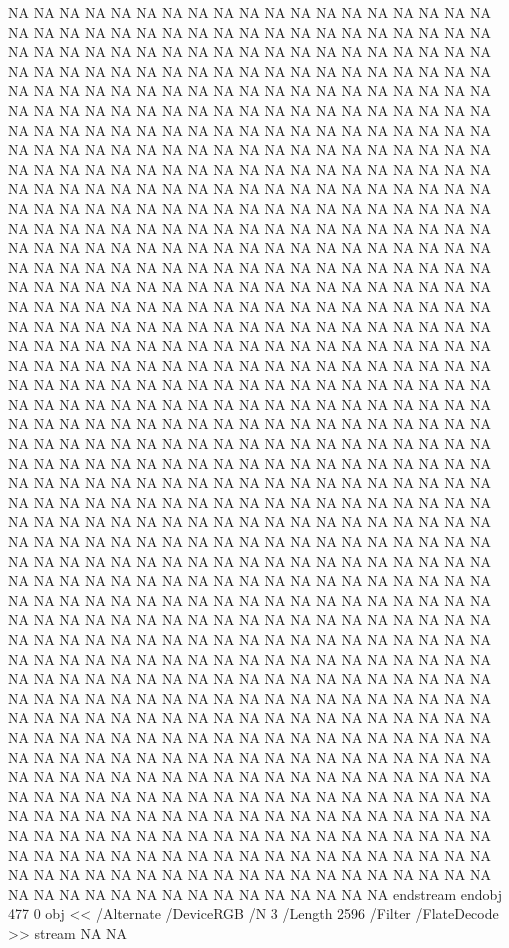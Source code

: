 {NA
NA
NA
NA
NA
NA
NA
NA
NA
NA
NA
NA
NA
NA
NA
NA
NA
NA
NA
NA
NA
NA
NA
NA
NA
NA
NA
NA
NA
NA
NA
NA
NA
NA
NA
NA
NA
NA
NA
NA
NA
NA
NA
NA
NA
NA
NA
NA
NA
NA
NA
NA
NA
NA
NA
NA
NA
NA
NA
NA
NA
NA
NA
NA
NA
NA
NA
NA
NA
NA
NA
NA
NA
NA
NA
NA
NA
NA
NA
NA
NA
NA
NA
NA
NA
NA
NA
NA
NA
NA
NA
NA
NA
NA
NA
NA
NA
NA
NA
NA
NA
NA
NA
NA
NA
NA
NA
NA
NA
NA
NA
NA
NA
NA
NA
NA
NA
NA
NA
NA
NA
NA
NA
NA
NA
NA
NA
NA
NA
NA
NA
NA
NA
NA
NA
NA
NA
NA
NA
NA
NA
NA
NA
NA
NA
NA
NA
NA
NA
NA
NA
NA
NA
NA
NA
NA
NA
NA
NA
NA
NA
NA
NA
NA
NA
NA
NA
NA
NA
NA
NA
NA
NA
NA
NA
NA
NA
NA
NA
NA
NA
NA
NA
NA
NA
NA
NA
NA
NA
NA
NA
NA
NA
NA
NA
NA
NA
NA
NA
NA
NA
NA
NA
NA
NA
NA
NA
NA
NA
NA
NA
NA
NA
NA
NA
NA
NA
NA
NA
NA
NA
NA
NA
NA
NA
NA
NA
NA
NA
NA
NA
NA
NA
NA
NA
NA
NA
NA
NA
NA
NA
NA
NA
NA
NA
NA
NA
NA
NA
NA
NA
NA
NA
NA
NA
NA
NA
NA
NA
NA
NA
NA
NA
NA
NA
NA
NA
NA
NA
NA
NA
NA
NA
NA
NA
NA
NA
NA
NA
NA
NA
NA
NA
NA
NA
NA
NA
NA
NA
NA
NA
NA
NA
NA
NA
NA
NA
NA
NA
NA
NA
NA
NA
NA
NA
NA
NA
NA
NA
NA
NA
NA
NA
NA
NA
NA
NA
NA
NA
NA
NA
NA
NA
NA
NA
NA
NA
NA
NA
NA
NA
NA
NA
NA
NA
NA
NA
NA
NA
NA
NA
NA
NA
NA
NA
NA
NA
NA
NA
NA
NA
NA
NA
NA
NA
NA
NA
NA
NA
NA
NA
NA
NA
NA
NA
NA
NA
NA
NA
NA
NA
NA
NA
NA
NA
NA
NA
NA
NA
NA
NA
NA
NA
NA
NA
NA
NA
NA
NA
NA
NA
NA
NA
NA
NA
NA
NA
NA
NA
NA
NA
NA
NA
NA
NA
NA
NA
NA
NA
NA
NA
NA
NA
NA
NA
NA
NA
NA
NA
NA
NA
NA
NA
NA
NA
NA
NA
NA
NA
NA
NA
NA
NA
NA
NA
NA
NA
NA
NA
NA
NA
NA
NA
NA
NA
NA
NA
NA
NA
NA
NA
NA
NA
NA
NA
NA
NA
NA
NA
NA
NA
NA
NA
NA
NA
NA
NA
NA
NA
NA
NA
NA
NA
NA
NA
NA
NA
NA
NA
NA
NA
NA
NA
NA
NA
NA
NA
NA
NA
NA
NA
NA
NA
NA
NA
NA
NA
NA
NA
NA
NA
NA
NA
NA
NA
NA
NA
NA
NA
NA
NA
NA
NA
NA
NA
NA
NA
NA
NA
NA
NA
NA
NA
NA
NA
NA
NA
NA
NA
NA
NA
NA
NA
NA
NA
NA
NA
NA
NA
NA
NA
NA
NA
NA
NA
NA
NA
NA
NA
NA
NA
NA
NA
NA
NA
NA
NA
NA
NA
NA
NA
NA
NA
NA
NA
NA
NA
NA
NA
NA
NA
NA
NA
NA
NA
NA
NA
NA
NA
NA
NA
NA
NA
NA
NA
NA
NA
NA
NA
NA
NA
NA
NA
NA
NA
NA
NA
NA
NA
NA
NA
NA
NA
NA
NA
NA
NA
NA
NA
NA
NA
NA
NA
NA
NA
NA
NA
NA
NA
NA
NA
NA
NA
NA
NA
NA
NA
NA
NA
NA
NA
NA
NA
NA
NA
NA
NA
NA
NA
NA
NA
NA
NA
NA
NA
NA
NA
NA
NA
NA
NA
NA
NA
NA
NA
NA
NA
NA
NA
NA
NA
NA
NA
NA
NA
NA
NA
NA
NA
NA
NA
NA
NA
NA
NA
NA
NA
NA
NA
NA
NA
NA
NA
NA
NA
NA
NA
NA
NA
NA
NA
NA
NA
NA
NA
NA
NA
NA
NA
NA
NA
NA
NA
NA
NA
NA
NA
NA
NA
NA
NA
NA
NA
NA
NA
NA
NA
NA
NA
NA
NA
NA
NA
NA
NA
NA
NA
NA
NA
NA
NA
NA
NA
NA
NA
NA
NA
NA
NA
NA
NA
NA
NA
NA
NA
NA
NA
NA
NA
NA
NA
NA
NA
NA
NA
NA
NA
NA
NA
NA
NA
NA
NA
NA
NA
NA
NA
NA
NA
NA
NA
NA
NA
NA
NA
NA
NA
NA
NA
NA
NA
NA
NA
NA
NA
NA
NA
NA
NA
NA
NA
NA
NA
NA
NA
NA
NA
NA
NA
NA
NA
NA
NA
NA
NA
NA
NA
NA
NA
NA
NA
NA
NA
NA
NA
NA
NA
NA
NA
NA
NA
NA
NA
NA
NA
NA
NA
NA
NA
NA
NA
NA
NA
NA
NA
NA
NA
NA
NA
NA
NA
NA
NA
NA
NA
NA
NA
NA
NA
NA
NA
NA
NA
NA
NA
NA
NA
NA
NA
NA
NA
NA
NA
NA
NA
NA
NA
NA
NA
NA
endstream
endobj
477 0 obj
<<
/Alternate /DeviceRGB
/N 3
/Length 2596
/Filter /FlateDecode
>>
stream
NA
NA

}
